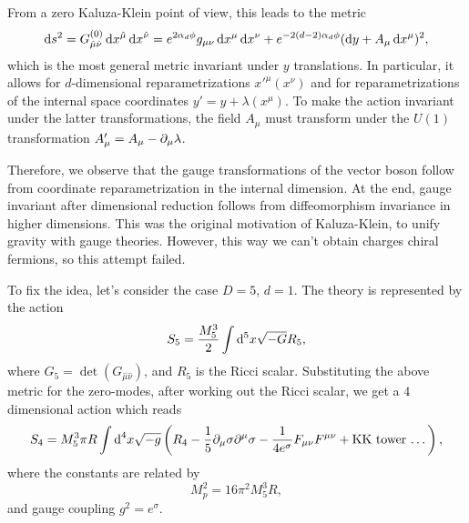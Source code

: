 From a zero Kaluza-Klein point of view, this leads to the metric
\begin{equation}
    \mathop{}\!\mathrm{d} s^2 = G^{(0)}_{\hat{\mu}\hat{\nu}} \mathop{}\!\mathrm{d} x^{\hat{\mu}} \mathop{}\!\mathrm{d} x^{\hat{\nu}} = e^{2\alpha_d \phi} g_{\mu\nu} \mathop{}\!\mathrm{d} x^\mu \mathop{}\!\mathrm{d} x^\nu + e^{-2(d-2)\alpha_d \phi} (\mathop{}\!\mathrm{d} y + A_\mu \mathop{}\!\mathrm{d} x^\mu)^2 , 
\end{equation}
which is the most general metric invariant under $y$ translations. In particular, it allows for $d$-dimensional reparametrizations $x'^\mu(x^\nu)$ and for reparametrizations of the internal space coordinates $y' = y + \lambda(x^\mu)$. To make the action invariant under the latter transformations, the field $A_\mu$ must transform under the $U(1)$ transformation $A'_\mu = A_\mu - \partial_\mu \lambda$.

Therefore, we observe that the gauge transformations of the vector boson follow from coordinate reparametrization in the internal dimension. At the end, gauge invariant after dimensional reduction follows from diffeomorphism invariance in higher dimensions. This was the original motivation of Kaluza-Klein, to unify gravity with gauge theories. However, this way we can't obtain charges chiral fermions, so this attempt failed.

To fix the idea, let's consider the case $D=5$, $d=1$. The theory is represented by the action
\begin{equation}
    S_5 = \frac{M^3_5}{2} \int \mathop{}\!\mathrm{d}^5 x \sqrt{-G} R_5,
\end{equation}
where $G_5 = \det(G_{\hat{\mu} \hat{\nu}})$, and $R_5$ is the Ricci scalar. Substituting the above metric for the zero-modes, after working out the Ricci scalar, we get a $4$ dimensional action which reads
\begin{equation}
    S_4 = M^3_5 \pi R \int {\mathop{}\!\mathrm{d}}^4 x \sqrt{-g} \left( R_4 -\frac{1}{5} \partial_\mu \sigma \partial^\mu \sigma - \frac{1}{4 e^\sigma} F_{\mu\nu} F^{\mu\nu} + \textup{KK tower \dots} \right),
\end{equation}
where the constants are related by
\begin{equation}\label{eq:relation-plank-masses}
    M^2_p = 16 \pi^2 M^3_5 R,
\end{equation}
and gauge coupling $g^2 = e^\sigma$.

